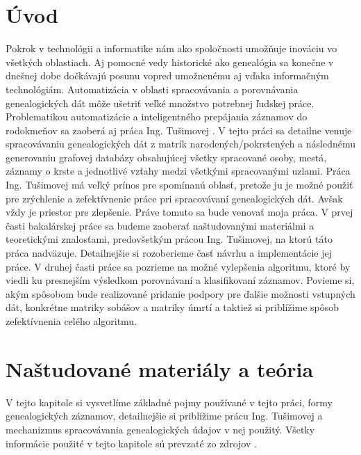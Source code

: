 \chapter{Úvod}

Pokrok v technológii a informatike nám ako spoločnosti umožňuje inováciu vo všetkých 
oblastiach. Aj pomocné vedy historické ako genealógia sa konečne v dnešnej dobe 
dočkávajú posunu vopred umožnenému aj vďaka informačným technológiám. Automatizácia 
v oblasti spracovávania a porovnávania genealogických dát môže ušetriť veľké množstvo 
potrebnej ľudskej práce. Problematikou automatizácie a inteligentného prepájania záznamov 
do rodokmeňov sa zaoberá aj práca Ing. Tušimovej \cite{formalniDP}. V tejto práci sa detailne venuje 
spracovávaniu genealogických dát z matrík narodených/pokrstených a následnému 
generovaniu grafovej databázy obsahujúcej všetky spracované osoby, mestá, záznamy 
o krste a jednotlivé vzťahy medzi všetkými spracovanými uzlami. Práca Ing. Tušimovej má 
veľký prínos pre spomínanú oblasť, pretože ju je možné použiť pre zrýchlenie a zefektívnenie 
práce pri spracovávaní genealogických dát. Avšak vždy je priestor pre zlepšenie. Práve 
tomuto sa bude venovať moja práca. 
 V prvej časti bakalárskej práce sa budeme zaoberať naštudovanými materiálmi
a teoretickými znalosťami, predovšetkým prácou Ing. Tušimovej, na ktorú táto práca 
nadväzuje. Detailnejšie si rozoberieme časť návrhu a implementácie jej práce. 
 V druhej časti práce sa pozrieme na možné vylepšenia algoritmu, ktoré by viedli ku 
presnejším výsledkom porovnávaní a klasifikovaní záznamov. Povieme si, akým spôsobom 
bude realizované pridanie podpory pre ďalšie možnosti vstupných dát, konkrétne matriky 
sobášov a matriky úmrtí a taktiež si priblížime spôsob zefektívnenia celého algoritmu.

\chapter{Naštudované materiály a teória} 
\label{struktura}
V tejto kapitole si vysvetlíme základné pojmy používané v tejto práci, formy genealogických 
záznamov, detailnejšie si priblížime prácu Ing. Tušimovej a mechanizmus spracovávania 
genealogických údajov v nej použitý. Všetky informácie použité v tejto kapitole sú prevzaté 
zo zdrojov \cite{formalniDP, britannica, kotesova, lednicka}.

